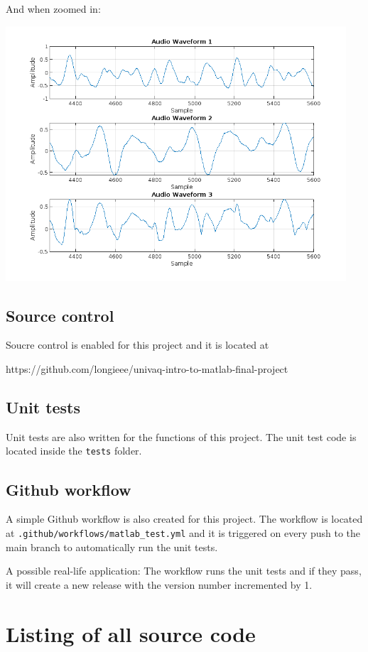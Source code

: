 \documentclass[a4paper,12pt]{article}
\begin{document}
And when zoomed in:

\includegraphics[width=0.95\textwidth]{rendered/audio_result_normalized_zoomed.png}

\subsection{Source control}

Soucre control is enabled for this project and it is located at

https://github.com/longieee/univaq-intro-to-matlab-final-project

\subsection{Unit tests}

Unit tests are also written for the functions of this project. The unit test code is located inside the \verb|tests| folder.

\subsection{Github workflow}

A simple Github workflow is also created for this project. The workflow is located at \verb|.github/workflows/matlab_test.yml|
and it is triggered on every push to the main branch to automatically run the unit tests.

A possible real-life application: The workflow runs the unit tests and if they pass, it will create a new release with the version number incremented by 1.

\section{Listing of all source code}
\end{document}

